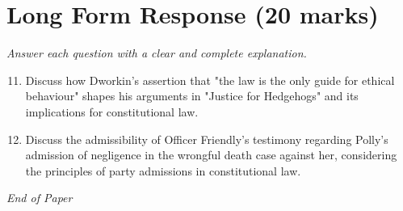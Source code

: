\documentclass[12pt]{article}
\begin{document}
\section*{Long Form Response (20 marks)}
\textit{Answer each question with a clear and complete explanation.}
\begin{enumerate}[label=\arabic*.]
\setcounter{enumi}{10}
\item Discuss how Dworkin's assertion that "the law is the only guide for ethical behaviour" shapes his arguments in "Justice for Hedgehogs" and its implications for constitutional law.
\item Discuss the admissibility of Officer Friendly's testimony regarding Polly's admission of negligence in the wrongful death case against her, considering the principles of party admissions in constitutional law.
\end{enumerate}

\vfill
\noindent\textit{End of Paper}
\end{document}
